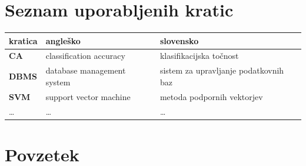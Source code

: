 \documentclass[a4paper, 12pt]{book}
\newcommand{\clearemptydoublepage}{\newpage{\pagestyle{empty}\cleardoublepage}}
\begin{document}
\clearemptydoublepage


\chapter*{Seznam uporabljenih kratic}  %

\noindent\begin{tabular}{p{}|p{}|p{}}    %
  {\bf kratica} & {\bf angleško}                             & {\bf slovensko} \\ \hline
  {\bf CA}      & classification accuracy               & klasifikacijska točnost \\
  {\bf DBMS} & database management system & sistem za upravljanje podatkovnih baz \\
  {\bf SVM}   & support vector machine              & metoda podpornih vektorjev \\
  \dots & \dots & \dots \\
\end{tabular}


\clearemptydoublepage

\chapter*{Povzetek}
\end{document}
